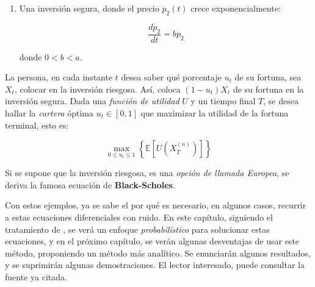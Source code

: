 \begin{enumerate}
\begin{enumerate}
		\item Una inversión segura, donde el precio $p_2 (t)$ crece exponencialmente:

		\[
			\frac{dp_2}{dt} = bp_2	
		\]

		donde $0 < b < a$.

	\end{enumerate}

	La persona, en cada instante $t$ desea saber qué porcentaje $u_t$ de su fortuna, sea $X_t$, colocar en la inversión riesgosa. Así, coloca $(1 - u_t)X_t$ de su fortuna en la inversión segura. Dada una \textit{función de utilidad} $U$ y un tiempo final $T$, se desea hallar la \textit{cartera} óptima $u_t \in [0, 1]$ que maximizar la utilidad de la fortuna terminal, esto es:

	\[
		\max_{0 \leq u_t \leq 1} \left\{  \mathbb{E}[ U(X_T^{(n)}) ] \right\}
	\]

	Si se supone que la inversión riesgosa, es una \textit{opción de llamada Europea}, se deriva la famosa ecuación de \textbf{Black-Scholes}.


\end{enumerate}


Con estos ejemplos, ya se sabe el por qué es necesario, en algunos casos, recurrir a estas ecuaciones diferenciales con ruido. En este capítulo, siguiendo el tratamiento de \cite{EDE_Oksendal}, se verá un enfoque \textit{probabilístico} para solucionar estas ecuaciones, y en el próximo capítulo, se verán algunas desventajas de usar este método, proponiendo un método más analítico. Se enunciarán algunos resultados, y se suprimirán algunas demostraciones. El lector interesado, puede consultar la fuente ya citada.





























